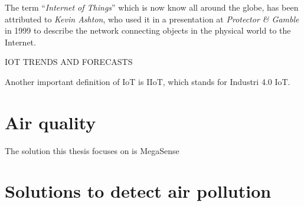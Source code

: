 
The term ``\textit{Internet of Things}'' which is now know all around the globe, has been attributed to \textit{Kevin Ashton}, who used it in a presentation at \textit{Protector \& Gamble} in 1999 \cite{iot_definition} to describe the network connecting objects in the physical world to the Internet.

IOT TRENDS AND FORECASTS


Another important definition of IoT is IIoT, which stands for Industri 4.0 IoT.

\section{Air quality}



The solution this thesis focuses on is MegaSense

\section{Solutions to detect air pollution}


